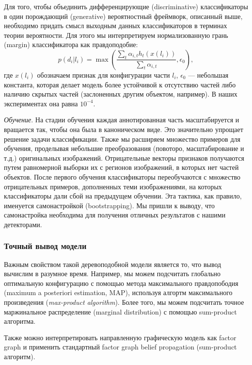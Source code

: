 Для того, чтобы объединить дифференцирующие (discriminative) классификаторы в один порождающий (generative) вероятностный фреймворк, описанный выше, необходимо придать смысл выходным данных классификаторов в терминах теории вероятности. Для этого мы интерпретируем нормализованную грань (margin) классификатора как правдоподобие:
\begin{displaymath}
  p(d_i|l_i) = \max{\left(\frac{\sum_t{\alpha_{i,t}h_t(x(l_i))}}{\sum_t{\alpha_{i,t}}},\epsilon_0\right)},
\end{displaymath}
где $x(l_i)$ обозначаем признак для конфигурации части $l_i$, $\epsilon_0$ --- небольшая константа, которая делает модель более устойчивой к отсутствию частей либо наличию скрытых частей (заслоненных другим объектом, например). В наших экспериментах она равна $10^{-4}$.

\emph{Обучение}. На стадии обучения каждая аннотированная часть масштабируется и вращается так, чтобы она была в каноническом виде. Это значительно упрощает решение задачи классификации. Также мы расширяем множество примеров для обучения, проделывая небольшие преобразования (повоторо, масштабирование и т.д.) оригинальных изображений. Отрицательные векторы признаков получаются путем равномерной выборки их с регионов изображений, в которых нет частей объектов. После первого обучения классификаторы переобучаются с множество отрицательных примеров, дополненных теми изображениями, на которых классификаторы дали сбой на предыдущем обучении. Эта тактика, как правило, именуется самонастройкой (bootstrapping). Мы пришли к выводу, что самонастройка необходима для получения отличных результатов с нашими детекторами.

\subsubsection{Точный вывод модели}

Важным свойством такой деревоподобной модели является то, что вывод вычислим в разумное время. Например, мы можем подсчитать глобально оптимальную конфигурацию с помощью метода максимального правдопободия (maximum a posteriori estimation, MAP), используя алгортм максимального произведения (\emph{max-product algorithm}). Более того, мы можем подсчитать точное маржинальное распределение (marginal distribution) с помощью sum-product алгоритма.

Также можно интерпретировать направленную графическую модель как factor graph и применить стандартный factor graph belief propagation (sum-product алгоритм).

